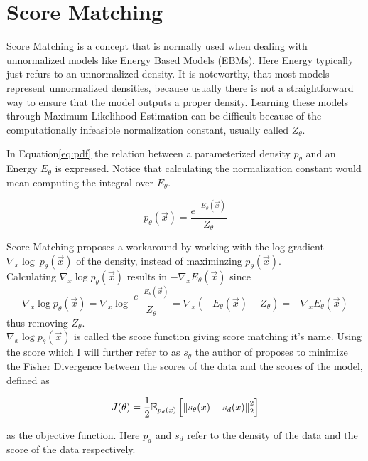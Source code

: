\section{Score Matching}
\label{sec:sm}

Score Matching \cite{sm} is a concept that is normally used when dealing with unnormalized models like Energy Based Models (EBMs). Here 
Energy typically just refurs to an unnormalized density. It is noteworthy, that most models represent unnormalized densities, 
because usually there is not a straightforward way to ensure that the model outputs a proper density.
Learning these models through Maximum Likelihood Estimation can be difficult because of the computationally infeasible normalization 
constant, usually called $Z_\theta$.


In Equation\ref{eq:pdf} the relation between a parameterized density $p_\theta$ and an Energy $E_\theta$ is expressed. Notice that calculating the normalization constant would 
mean computing the integral over $E_\theta$.

\begin{equation}
    \label{eq:pdf}
    p_\theta(\vec x) = \frac{e^{-E_\theta(\vec x)}}{Z_\theta}
\end{equation}

Score Matching proposes a workaround by working with the log gradient $\nabla_x \log \ p_\theta(\vec x)$ of the density, 
instead of maximinzing $p_\theta(\vec x)$. \\

Calculating $\nabla_x \log p_\theta(\vec x)$ results in $- \nabla_x E_\theta(\vec x)$ since 
\[\nabla_x \log p_\theta(\vec x) = \nabla_x \log \ \frac{e^{- E_\theta(\vec x)}}{Z_\theta} = \nabla_x \left( - E_\theta(\vec x) - {Z_\theta} \right) = - \nabla_x E_\theta(\vec x)\]
thus removing $Z_\theta$.\\

$\nabla_x \log p_\theta(\vec x)$ is called the score function giving score matching it's name.
Using the score which I will further refer to as $s_\theta$ the author of \cite{sm} proposes to minimize the Fisher Divergence between 
the scores of the data and the scores of the model, defined as 

\begin{equation}
    \label{eq:fisher}
    J(\theta) = \frac{1}{2} \mathbb{E}_{p_d(x)} \left[ \left\lVert s_\theta(x) - s_d(x)\right\rVert^2_2 \right]
\end{equation}

as the objective function. Here $p_d$ and $s_d$ refer to the density of the data and the score of the data respectively.

